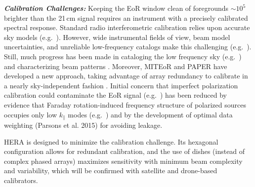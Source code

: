 \documentclass[preprint,11pt]{aastex}
\begin{document}

\noindent \textbf{\textit{Calibration Challenges:}} Keeping the EoR window clean of foregrounds $\sim 10^5$ brighter than the 21\,cm signal requires an instrument with a precisely calibrated spectral response.
Standard radio interferometric
calibration relies upon accurate sky models (e.g.\ \citealt{Smirnov2011}).
However, wide instrumental fields of view, beam model uncertainties, and unreliable low-frequency catalogs
make this
challenging (e.g.\ \citealt{jacobs_et_al2013a,jacobs_et_al2013b, braun_et_al2013}).  Still, much
progress has been made in cataloging the low frequency sky (e.g.\ \citealt{hurleywalker_et_al2014}) and characterizing beam patterns \citep{pober_et_al2011,
neben_et_al2015, sutinjo_et_al2015}. Moreover, MITEoR and PAPER have developed a new approach, taking advantage of array
redundancy to calibrate in a nearly sky-independent fashion \citep{zheng_et_al2014,ali_et_al2015}. 
Initial concern that imperfect polarization calibration could contaminate the EoR signal  (e.g.\ \citealt{bernardi_et_al2010, jelic_et_al2010,
moore_et_al2013}) has been reduced by evidence that Faraday rotation-induced frequency structure of
polarized sources occupies only low $k_\|$ modes (e.g.\
\citealt{bernardi_2013, Moore_et_al2015}) and by the development of optimal data weighting (Parsons et al. 2015) for avoiding leakage.


HERA is designed to minimize the calibration challenge. 
Its hexagonal configuration allows for redundant calibration, and 
the use of dishes (instead of
complex phased arrays) 
maximizes sensitivity with minimum beam complexity and variability, which will be confirmed with
satellite \citep{neben_et_al2015} and drone-based calibrators.
\end{document}
